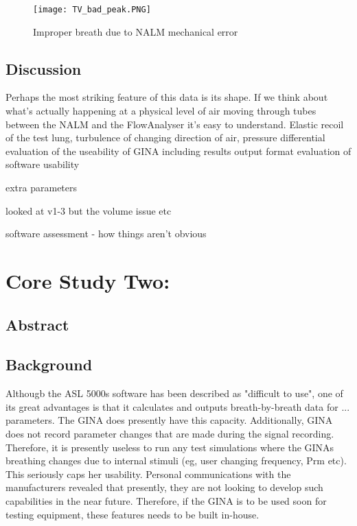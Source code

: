 \documentclass[12pt, openany, oneside]{book}
\begin{document}
\begin{figure}
	\centering
	\texttt{[image: TV\_bad\_peak.PNG]}		
	\caption{Improper breath due to NALM  mechanical error}
	\label{fig:nalmerror}

\end{figure}



\section{Discussion}

Perhaps the most striking feature of this data is its shape. If we think about what's actually happening at a physical level of air moving through tubes between the NALM and the FlowAnalyser it's easy to understand. Elastic recoil of the test lung, turbulence of changing direction of air, pressure differential
evaluation of the useability of GINA including results output format
evaluation of software usability

extra parameters

looked at v1-3 but the volume issue etc

software assessment - how things aren't obvious


\chapter{Core Study Two:}

\section{Abstract}
\section{Background}
Althougb the ASL 5000s software has been described as "difficult to use", one of its great advantages is that it calculates and outputs breath-by-breath data for ... parameters.
The GINA does presently have this capacity. Additionally, GINA does not record parameter changes that are made during the signal recording. Therefore, it is presently useless to run any test simulations where the GINAs breathing changes due to internal stimuli (eg, user changing frequency, Prm etc). This seriously caps her usability.  Personal communications with the manufacturers revealed that presently, they are not looking to develop such capabilities in the near future. Therefore, if the GINA is to be used soon for testing equipment, these features needs to be built in-house.
\end{document}
